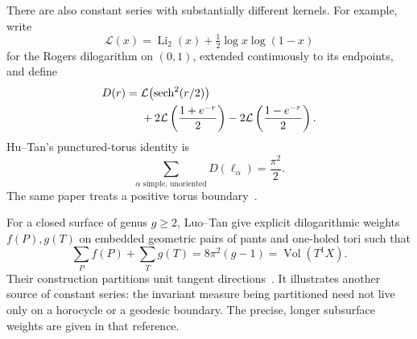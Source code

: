 There are also constant series with substantially different kernels.
For example, write
\[
 \mathcal L(x)=\operatorname{Li}_2(x)+\tfrac12\log x\log(1-x)
\]
for the Rogers dilogarithm on $(0,1)$, extended continuously to its
endpoints, and define
\begin{align*}
 D(r)={}&\mathcal L\bigl(\operatorname{sech}^2(r/2)\bigr)\\
 &+2\mathcal L\left(\frac{1+e^{-r}}2\right)
  -2\mathcal L\left(\frac{1-e^{-r}}2\right).
\end{align*}
Hu--Tan's punctured-torus identity is
\begin{equation}
 \sum_{\alpha\text{ simple, unoriented}}D(\ell_\alpha)=\frac{\pi^2}{2}.
 \label{eq:dilogtorus}
\end{equation}
The same paper treats a positive torus boundary~\cite[Theorems 1--2]{HuTan}.

For a closed surface of genus $g\ge2$, Luo--Tan give explicit dilogarithmic
weights $f(P),g(T)$ on embedded geometric pairs of pants and one-holed tori
such that
\begin{equation}
 \sum_P f(P)+\sum_T g(T)=8\pi^2(g-1)=\operatorname{Vol}(T^1X).
 \label{eq:luotan}
\end{equation}
Their construction partitions unit tangent directions~\cite{LuoTan}.
It illustrates another source of constant series: the invariant measure
being partitioned need not live only on a horocycle or a geodesic boundary.
The precise, longer subsurface weights are given in that reference.

